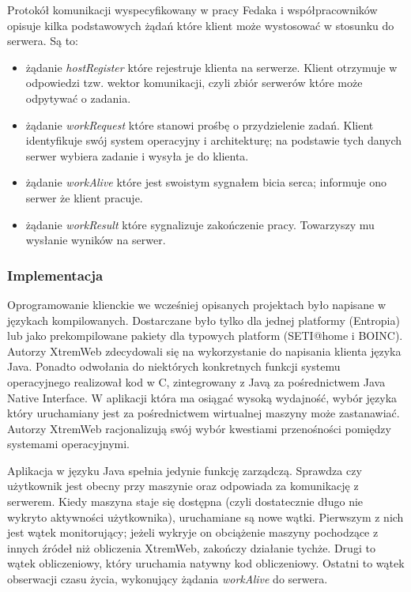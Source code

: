 \documentclass[12pt,a4paper,twoside]{article}
\begin{document}
Protokół komunikacji wyspecyfikowany w pracy Fedaka i współpracowników opisuje kilka podstawowych żądań które klient może wystosować w stosunku do serwera. Są to:

\begin{itemize}
\item żądanie \textit{hostRegister} które rejestruje klienta na serwerze. Klient otrzymuje w odpowiedzi tzw. wektor komunikacji, czyli zbiór serwerów które może odpytywać o zadania.
\item żądanie \textit{workRequest} które stanowi prośbę o przydzielenie zadań. Klient identyfikuje swój system operacyjny i architekturę; na podstawie tych danych serwer wybiera zadanie i wysyła je do klienta.
\item żądanie \textit{workAlive} które jest swoistym sygnałem bicia serca; informuje ono serwer że klient pracuje.
\item żądanie \textit{workResult} które sygnalizuje zakończenie pracy. Towarzyszy mu wysłanie wyników na serwer.
\end{itemize}

\subsubsection{Implementacja}

Oprogramowanie klienckie we wcześniej opisanych projektach było napisane w językach kompilowanych. Dostarczane było tylko dla jednej platformy (Entropia) lub jako prekompilowane pakiety dla typowych platform (SETI@home i BOINC). Autorzy XtremWeb zdecydowali się na wykorzystanie do napisania klienta języka Java. Ponadto odwołania do niektórych konkretnych funkcji systemu operacyjnego realizował kod w C, zintegrowany z Javą za pośrednictwem Java Native Interface. W aplikacji która ma osiągać wysoką wydajność, wybór języka który uruchamiany jest za pośrednictwem wirtualnej maszyny może zastanawiać. Autorzy XtremWeb racjonalizują swój wybór kwestiami przenośności pomiędzy systemami operacyjnymi.

Aplikacja w języku Java spełnia jedynie funkcję zarządczą. Sprawdza czy użytkownik jest obecny przy maszynie oraz odpowiada za komunikację z serwerem. Kiedy maszyna staje się dostępna (czyli dostatecznie długo nie wykryto aktywności użytkownika), uruchamiane są nowe wątki. Pierwszym z nich jest wątek monitorujący; jeżeli wykryje on obciążenie maszyny pochodzące z innych źródeł niż obliczenia XtremWeb, zakończy działanie tychże. Drugi to wątek obliczeniowy, który uruchamia natywny kod obliczeniowy. Ostatni to wątek obserwacji czasu życia, wykonujący żądania \textit{workAlive} do serwera.
\end{document}
